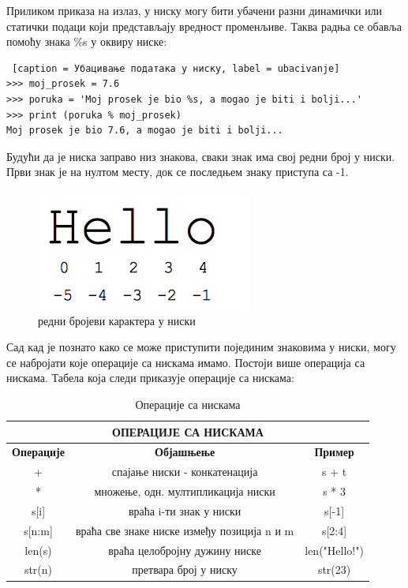 Приликом приказа на излаз, у ниску могу бити убачени разни динамички или статички подаци који представљају вредност променљиве. Таква радња се обавља помоћу знака \%s у оквиру ниске:

\begin{lstlisting} [caption = Убацивање података у ниску, label = ubacivanje]
>>> moj_prosek = 7.6
>>> poruka = 'Moj prosek je bio %s, a mogao je biti i bolji...'
>>> print (poruka % moj_prosek)
Moj prosek je bio 7.6, a mogao je biti i bolji...
\end{lstlisting}

Будући да је ниска заправо низ знакова, сваки знак има свој редни број у ниски. Први знак је на нултом месту, док се последњем знаку приступа са -1.

\begin{figure}[hеre]
\centering
\includegraphics{hello_string.png}
\caption{редни бројеви карактера у ниски}
\label{slike:hello}
\end{figure}


Сад кад је познато како се може приступити појединим знаковима у ниски, могу се набројати које операције са нискама имамо. Постоји више операција са нискама. Табела која следи приказује операције са нискама:

\begin{table}[h]
\centering
\begin{tabular}{|c|c|c|} \hline
\multicolumn{3}{|c|}{\textbf{ОПЕРАЦИЈЕ СА НИСКАМА}}\\ \hline
\textbf{Операције} & \textbf{Објашњење} & \textbf{Пример} \\ \hline
                 + & спајање ниски - конкатенација & s + t \\ \hline
                 * & множење, одн. мултипликација ниски & s * 3 \\ \hline
              s[i] & враћа i-ти знак у ниски & s[-1] \\ \hline
            s[n:m] & враћа све знаке ниске између позиција n и m & s[2:4] \\ \hline
            len(s) & враћа целобројну дужину ниске & len("Hello!") \\ \hline
            str(n) & претвара број у ниску & str(23) \\ \hline
\end{tabular}\medskip
\caption{Операције са нискама}
\label{tabele:strings}
\end{table}

